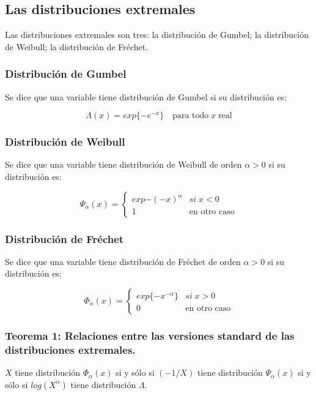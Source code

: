 \documentclass[
  12pt]{article}
\begin{document}
\hypertarget{las-distribuciones-extremales}{%
\subsection{Las distribuciones
extremales}\label{las-distribuciones-extremales}}

Las distribuciones extremales son tres: la distribución de Gumbel; la
distribución de Weibull; la distribución de Fréchet.

\hypertarget{distribuciuxf3n-de-gumbel}{%
\subsubsection{Distribución de Gumbel}\label{distribuciuxf3n-de-gumbel}}

Se dice que una variable tiene distribución de Gumbel si su distribución
es:

\[ \Lambda(x) = exp\{-e^{-x}\} \quad\text{para todo}\; x \;\text{real} \]

\hypertarget{distribuciuxf3n-de-weibull}{%
\subsubsection{Distribución de
Weibull}\label{distribuciuxf3n-de-weibull}}

Se dice que una variable tiene distribución de Weibull de orden
\(\alpha>0\) si su distribución es:

\[\Psi_{\alpha}(x)=\begin{cases}
exp{-(-x)^{\alpha}} & si\;x<0\\
1 & \text{en otro caso}
\end{cases}\]

\hypertarget{distribuciuxf3n-de-fruxe9chet}{%
\subsubsection{Distribución de
Fréchet}\label{distribuciuxf3n-de-fruxe9chet}}

Se dice que una variable tiene distribución de Fréchet de orden
\(\alpha>0\) si su distribución es:

\[
\Phi_{\alpha}(x)=\begin{cases}
exp\{-x^{-\alpha}\} & si\;x>0\\
0 & \text{en otro caso}
\end{cases}
\] \newpage

\hypertarget{teorema-1-relaciones-entre-las-versiones-standard-de-las-distribuciones-extremales.}{%
\subsubsection{Teorema 1: Relaciones entre las versiones standard de las
distribuciones
extremales.}\label{teorema-1-relaciones-entre-las-versiones-standard-de-las-distribuciones-extremales.}}

\(X\) tiene distribución \(\Phi_{\alpha}(x)\) si y sólo si \((-1/X)\)
tiene distribución \(\Psi_{\alpha}(x)\) si y sólo si \(log(X^{\alpha})\)
tiene distribución \(\Lambda\).
\end{document}
